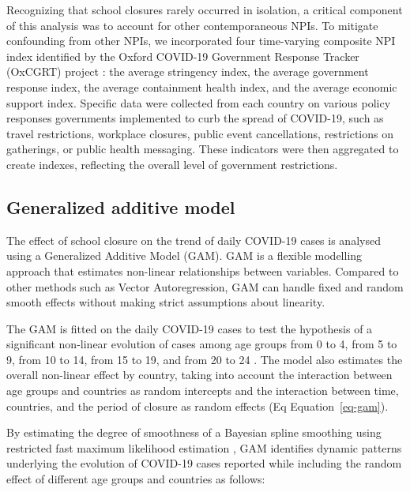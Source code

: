 \documentclass[
  number]{elsarticle}
\begin{document}
Recognizing that school closures rarely occurred in isolation, a
critical component of this analysis was to account for other
contemporaneous NPIs. To mitigate confounding from other NPIs, we
incorporated four time-varying composite NPI index identified by the
Oxford COVID-19 Government Response Tracker (OxCGRT) project
\citep{hale2021global}: the average stringency index, the average
government response index, the average containment health index, and the
average economic support index. Specific data were collected from each
country on various policy responses governments implemented to curb the
spread of COVID-19, such as travel restrictions, workplace closures,
public event cancellations, restrictions on gatherings, or public health
messaging. These indicators were then aggregated to create indexes,
reflecting the overall level of government restrictions.

\subsection{Generalized additive
model}\label{generalized-additive-model}

The effect of school closure on the trend of daily COVID-19 cases is
analysed using a Generalized Additive Model (GAM). GAM is a flexible
modelling approach that estimates non-linear relationships between
variables. Compared to other methods such as Vector Autoregression, GAM
can handle fixed and random smooth effects without making strict
assumptions about linearity.

The GAM is fitted on the daily COVID-19 cases to test the hypothesis of
a significant non-linear evolution of cases among age groups from 0 to
4, from 5 to 9, from 10 to 14, from 15 to 19, and from 20 to 24
\citep{wood2017generalized}. The model also estimates the overall
non-linear effect by country, taking into account the interaction
between age groups and countries as random intercepts and the
interaction between time, countries, and the period of closure as random
effects (Eq Equation~\ref{eq-gam}).

By estimating the degree of smoothness of a Bayesian spline smoothing
using restricted fast maximum likelihood estimation
\citep{wood2011fast}, GAM identifies dynamic patterns underlying the
evolution of COVID-19 cases reported while including the random effect
of different age groups and countries as follows:
\end{document}
